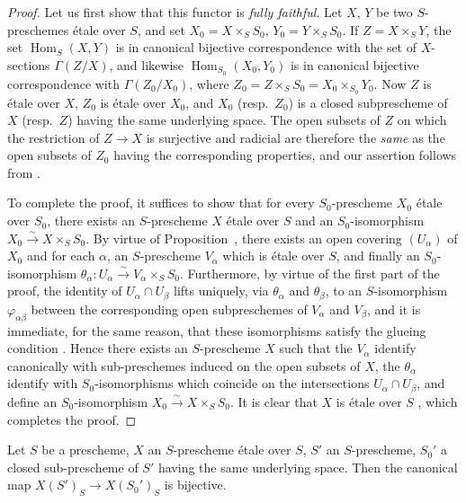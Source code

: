 \begin{proof}
Let us first show that this functor is \emph{fully faithful}.
Let $X$, $Y$ be two $S$-preschemes \'etale over $S$, and set $X_0=X\times_S S_0$, $Y_0=Y\times_S S_0$.
If $Z=X\times_S Y$, the set $\operatorname{Hom}_S(X,Y)$ is in canonical bijective correspondence with the set of $X$-sections $\Gamma(Z/X)$, and likewise $\operatorname{Hom}_{S_0}(X_0,Y_0)$ is in canonical bijective correspondence with $\Gamma(Z_0/X_0)$, where $Z_0=Z\times_S S_0=X_0\times_{S_0}Y_0$.
Now $Z$ is \'etale over $X$, $Z_0$ is \'etale over $X_0$, and $X_0$ (resp.\ $Z_0$) is a closed subprescheme of $X$ (resp.\ $Z$) having the same underlying space.  The open subsets of $Z$ on which the restriction of $Z\to X$ is surjective and radicial are therefore the \emph{same} as the open subsets of $Z_0$ having the corresponding properties, and our assertion follows from .

To complete the proof, it suffices to show that for every $S_0$-prescheme $X_0$ \'etale over $S_0$, there exists an $S$-prescheme $X$ \'etale over $S$ and an $S_0$-isomorphism $X_0\xrightarrow{\sim}X\times_S S_0$.
By virtue of Proposition~, there exists an open covering $(U_\alpha)$ of $X_0$ and for each $\alpha$, an $S$-prescheme $V_\alpha$ which is \'etale over $S$, and finally an $S_0$-isomorphism $\theta_\alpha:U_\alpha\xrightarrow{\sim}V_\alpha\times_S S_0$.
Furthermore, by virtue of the first part of the proof, the identity of $U_\alpha\cap U_\beta$ lifts uniquely, via $\theta_\alpha$ and $\theta_\beta$, to an $S$-isomorphism $\varphi_{\alpha\beta}$ between the corresponding open subpreschemes of $V_\alpha$ and $V_\beta$, and it is immediate, for the same reason, that these isomorphisms satisfy the glueing condition .
Hence there exists an $S$-prescheme $X$ such that the $V_\alpha$ identify canonically with sub-preschemes induced on the open subsets of $X$, the $\theta_\alpha$ identify with $S_0$-isomorphisms which coincide on the intersections $U_\alpha\cap U_\beta$, and define an $S_0$-isomorphism $X_0\xrightarrow{\sim}X\times_S S_0$.
It is clear that $X$ is \'etale over $S$ , which completes the proof.
\end{proof}

\begin{corollary}[18.1.3]
\label{IV.18.1.3}
Let $S$ be a prescheme, $X$ an $S$-prescheme \'etale over $S$, $S'$ an $S$-prescheme, $S_0'$ a closed sub-prescheme of $S'$ having the same underlying space.
Then the canonical map $X(S')_S\to X(S_0')_S$  is bijective.
\end{corollary}

